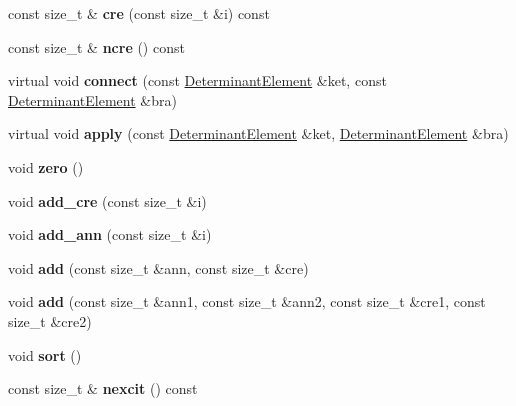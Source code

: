 \begin{DoxyCompactItemize}
\item 
const size\+\_\+t \& {\bfseries cre} (const size\+\_\+t \&i) const \hypertarget{classConnection_a4b466c63cf29f3c8f70b90e4824f2c49}{}\label{classConnection_a4b466c63cf29f3c8f70b90e4824f2c49}

\item 
const size\+\_\+t \& {\bfseries ncre} () const \hypertarget{classConnection_aa6f76ca038d3183e4fdf5f94e47e1a19}{}\label{classConnection_aa6f76ca038d3183e4fdf5f94e47e1a19}

\item 
virtual void {\bfseries connect} (const \hyperlink{classDeterminantElement}{Determinant\+Element} \&ket, const \hyperlink{classDeterminantElement}{Determinant\+Element} \&bra)\hypertarget{classConnection_a0c843525d4e2934fdaf10e9fad2bd50a}{}\label{classConnection_a0c843525d4e2934fdaf10e9fad2bd50a}

\item 
virtual void {\bfseries apply} (const \hyperlink{classDeterminantElement}{Determinant\+Element} \&ket, \hyperlink{classDeterminantElement}{Determinant\+Element} \&bra)\hypertarget{classConnection_a81b694174d09ef90256f705410b651e7}{}\label{classConnection_a81b694174d09ef90256f705410b651e7}

\item 
void {\bfseries zero} ()\hypertarget{classConnection_a07e46eda12da6ff7e5cfb66b00f716ac}{}\label{classConnection_a07e46eda12da6ff7e5cfb66b00f716ac}

\item 
void {\bfseries add\+\_\+cre} (const size\+\_\+t \&i)\hypertarget{classConnection_af617fea5e5082c941470eae7a795367c}{}\label{classConnection_af617fea5e5082c941470eae7a795367c}

\item 
void {\bfseries add\+\_\+ann} (const size\+\_\+t \&i)\hypertarget{classConnection_ad967f8812d0598ba228ef16b2f7436a5}{}\label{classConnection_ad967f8812d0598ba228ef16b2f7436a5}

\item 
void {\bfseries add} (const size\+\_\+t \&ann, const size\+\_\+t \&cre)\hypertarget{classConnection_af167b1fd395bceea3540d720437adf55}{}\label{classConnection_af167b1fd395bceea3540d720437adf55}

\item 
void {\bfseries add} (const size\+\_\+t \&ann1, const size\+\_\+t \&ann2, const size\+\_\+t \&cre1, const size\+\_\+t \&cre2)\hypertarget{classConnection_a4a7ab2893fb8b3a21162a055c3065c3c}{}\label{classConnection_a4a7ab2893fb8b3a21162a055c3065c3c}

\item 
void {\bfseries sort} ()\hypertarget{classConnection_ae50daf05c5a97ea366f26cbd7e2d0fe7}{}\label{classConnection_ae50daf05c5a97ea366f26cbd7e2d0fe7}

\item 
const size\+\_\+t \& {\bfseries nexcit} () const \hypertarget{classConnection_a7e83ced8023d813160513729b9216ede}{}\label{classConnection_a7e83ced8023d813160513729b9216ede}

\end{DoxyCompactItemize}
